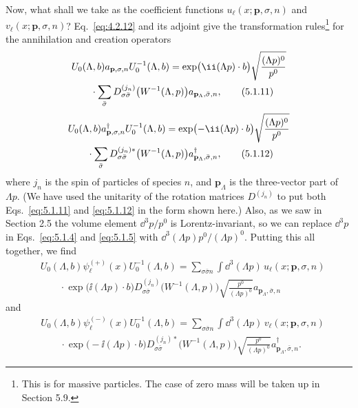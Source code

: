 Now, what shall we take as the coefficient functions
$u_\ell(x;\mathbf{p},\sigma,n)$ and $v_\ell(x;\mathbf{p},\sigma,n)$?
Eq.~\eqref{eq:4.2.12} and its adjoint give the transformation rules\footnote{This is for
massive particles. The case of zero mass will be taken up in Section 5.9.}
for the annihilation and creation operators
\begin{align}
  &U_0(\Lambda,b)a_{\mathbf{p},\sigma,n}U_0^{-1}(\Lambda,b)
  =\exp\bigl(\ii(\Lambda p)\cdot b\bigr)
  \sqrt{\frac{(\Lambda p)^0}{p^0}}
  \notag\\
  &\qquad\cdot\sum_{\bar\sigma}
  D^{(j_n)}_{\sigma\bar\sigma}\bigl(W^{-1}(\Lambda,p)\bigr)
  a_{\mathbf{p}_\Lambda,\bar\sigma,n},
  \tag{5.1.11}\label{eq:5.1.11}
\end{align}
\begin{align}
  &U_0(\Lambda,b)a^\dagger_{\mathbf{p},\sigma,n}U_0^{-1}(\Lambda,b)
  =\exp\bigl(-\ii(\Lambda p)\cdot b\bigr)
  \sqrt{\frac{(\Lambda p)^0}{p^0}}
  \notag\\
  &\qquad\cdot\sum_{\bar\sigma}
  D^{(j_n)*}_{\sigma\bar\sigma}\bigl(W^{-1}(\Lambda,p)\bigr)
  a^\dagger_{\mathbf{p}_\Lambda,\bar\sigma,n},
  \tag{5.1.12}\label{eq:5.1.12}
\end{align}
where $j_n$ is the spin of particles of species $n$, and $\mathbf{p}_\Lambda$
is the three-vector part of $\Lambda p$. (We have used the unitarity of the
rotation matrices $D^{(j_n)}$ to put both Eqs.~\eqref{eq:5.1.11} and \eqref{eq:5.1.12} in the
form shown here.) Also, as we saw in Section 2.5 the volume element
$\dd^3p/p^0$ is Lorentz-invariant, so we can replace $\dd^3p$ in Eqs.~\eqref{eq:5.1.4}
and \eqref{eq:5.1.5} with $\dd^3(\Lambda p)p^0/(\Lambda p)^0$. Putting this all together,
we find
\begin{align*}
  &U_0(\Lambda,b)\psi^{(+)}_\ell(x)U_0^{-1}(\Lambda,b)
  =\sum_{\sigma\bar\sigma n}\int \dd^3(\Lambda p)\,
  u_\ell(x;\mathbf{p},\sigma,n)
  \\
  &\qquad\cdot\exp\bigl(\ii(\Lambda p)\cdot b\bigr)
  D^{(j_n)}_{\sigma\bar\sigma}\bigl(W^{-1}(\Lambda,p)\bigr)
  \sqrt{\frac{p^0}{(\Lambda p)^0}}
  a_{\mathbf{p}_\Lambda,\bar\sigma,n}
\end{align*}
and
\begin{align*}
  &U_0(\Lambda,b)\psi^{(-)}_\ell(x)U_0^{-1}(\Lambda,b)
  =\sum_{\sigma\bar\sigma n}\int \dd^3(\Lambda p)\,
  v_\ell(x;\mathbf{p},\sigma,n)
  \\
  &\qquad\cdot\exp\bigl(-\ii(\Lambda p)\cdot b\bigr)
  D^{(j_n)*}_{\sigma\bar\sigma}\bigl(W^{-1}(\Lambda,p)\bigr)
  \sqrt{\frac{p^0}{(\Lambda p)^0}}
  a^\dagger_{\mathbf{p}_\Lambda,\bar\sigma,n}.
\end{align*}
